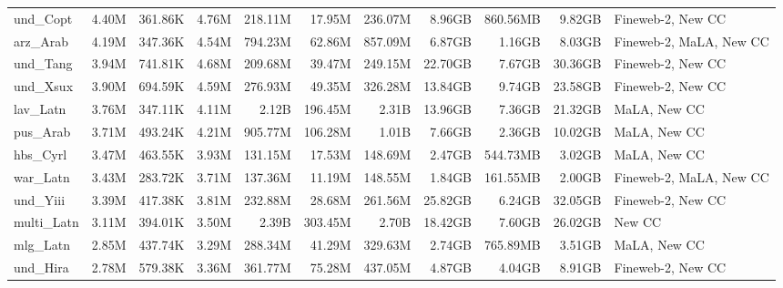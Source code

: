 \begin{table*}[!htp]
{\begin{tabular}{l|rrr|rrr|rrr|l}
und\_Copt                   & 4.40M      & 361.86K      & 4.76M       & 218.11M      & 17.95M         & 236.07M       & 8.96GB     & 860.56MB     & 9.82GB      & Fineweb-2, New CC       \\
arz\_Arab                   & 4.19M      & 347.36K      & 4.54M       & 794.23M      & 62.86M         & 857.09M       & 6.87GB     & 1.16GB       & 8.03GB      & Fineweb-2, MaLA, New CC \\
und\_Tang                   & 3.94M      & 741.81K      & 4.68M       & 209.68M      & 39.47M         & 249.15M       & 22.70GB    & 7.67GB       & 30.36GB     & Fineweb-2, New CC       \\
und\_Xsux                   & 3.90M      & 694.59K      & 4.59M       & 276.93M      & 49.35M         & 326.28M       & 13.84GB    & 9.74GB       & 23.58GB     & Fineweb-2, New CC       \\
lav\_Latn                   & 3.76M      & 347.11K      & 4.11M       & 2.12B        & 196.45M        & 2.31B         & 13.96GB    & 7.36GB       & 21.32GB     & MaLA, New CC            \\
pus\_Arab                   & 3.71M      & 493.24K      & 4.21M       & 905.77M      & 106.28M        & 1.01B         & 7.66GB     & 2.36GB       & 10.02GB     & MaLA, New CC            \\
hbs\_Cyrl                   & 3.47M      & 463.55K      & 3.93M       & 131.15M      & 17.53M         & 148.69M       & 2.47GB     & 544.73MB     & 3.02GB      & MaLA, New CC            \\
war\_Latn                   & 3.43M      & 283.72K      & 3.71M       & 137.36M      & 11.19M         & 148.55M       & 1.84GB     & 161.55MB     & 2.00GB      & Fineweb-2, MaLA, New CC \\
und\_Yiii                   & 3.39M      & 417.38K      & 3.81M       & 232.88M      & 28.68M         & 261.56M       & 25.82GB    & 6.24GB       & 32.05GB     & Fineweb-2, New CC       \\
multi\_Latn                 & 3.11M      & 394.01K      & 3.50M       & 2.39B        & 303.45M        & 2.70B         & 18.42GB    & 7.60GB       & 26.02GB     & New CC                  \\
mlg\_Latn                   & 2.85M      & 437.74K      & 3.29M       & 288.34M      & 41.29M         & 329.63M       & 2.74GB     & 765.89MB     & 3.51GB      & MaLA, New CC            \\
und\_Hira                   & 2.78M      & 579.38K      & 3.36M       & 361.77M      & 75.28M         & 437.05M       & 4.87GB     & 4.04GB       & 8.91GB      & Fineweb-2, New CC       \\

\end{tabular}}
\end{table*}
